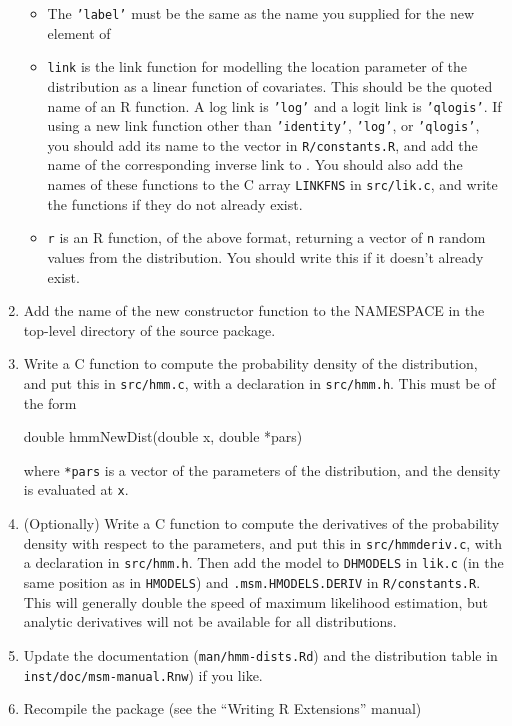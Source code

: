\begin{enumerate}
  \begin{itemize}
  \item The \texttt{'label'} must be the same as the name you
    supplied for the new element of 

  \item \texttt{link} is the link function for modelling the location
    parameter of the distribution as a linear function of covariates. This
    should be the quoted name of an R function.  A log link is
    \texttt{'log'} and a logit link is \texttt{'qlogis'}.  If
    using a new link function other than \texttt{'identity'},
    \texttt{'log'}, or \texttt{'qlogis'}, you should add its name
    to the vector  in \texttt{R/constants.R},
    and add the name of the corresponding inverse link to
    .  You should also add the names of these
    functions to the C array \texttt{LINKFNS} in \texttt{src/lik.c},
    and write the functions if they do not already exist.

  \item \texttt{r} is an R function, of the above format, returning a
    vector of \texttt{n} random values from the distribution.
    You should write this if it doesn't already exist.
  \end{itemize}

\item Add the name of the new constructor function to the NAMESPACE in
  the top-level directory of the source package.

\item Write a C function to compute the probability density of the
  distribution, and put this in \texttt{src/hmm.c}, with a declaration
  in \texttt{src/hmm.h}. This must be of the form
\begin{Scode}
  double hmmNewDist(double x, double *pars)
\end{Scode}

  where \texttt{*pars} is a vector of the parameters of the
  distribution, and the density is evaluated at \texttt{x}.

\item (Optionally) Write a C function to compute the derivatives of
  the probability density with respect to the parameters, and put this
  in \texttt{src/hmmderiv.c}, with a declaration in
  \texttt{src/hmm.h}.  Then add the model to \texttt{DHMODELS} in
  \texttt{lik.c} (in the same position as in \texttt{HMODELS}) and
  \texttt{.msm.HMODELS.DERIV} in \texttt{R/constants.R}.  This will
  generally double the speed of maximum likelihood estimation, but analytic 
  derivatives will not be available for all distributions.
  
\item Update the documentation (\texttt{man/hmm-dists.Rd}) and the
  distribution table in\\ \texttt{inst/doc/msm-manual.Rnw}) if you like.

\item Recompile the package (see the ``Writing R Extensions'' manual)

\end{enumerate}

